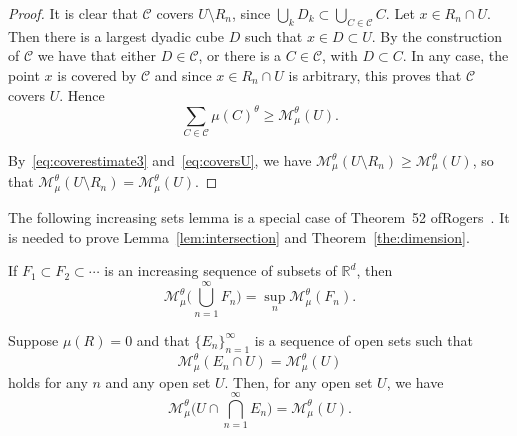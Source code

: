 \documentclass[AHL,Unicode,longabstracts]{cedram}
\begin{document}
\begin{proof}
It is clear that $\mathscr{C}$ covers $U \setminus R_n$, since $\bigcup_k D_k \subset \bigcup_{C \in \mathscr{C}} C$. Let $x \in R_n
\cap U$. Then there is a largest dyadic cube $D$ such that $x \in D
\subset U$. By the construction of $\mathscr{C}$ we have that either $D \in \mathscr{C}$, or there is a $C \in \mathscr{C}$, with $D
\subset C$. In any case, the point $x$ is covered by $\mathscr{C}$ and since $x \in R_n \cap U$ is arbitrary, this proves that $\mathscr{C}$ covers $U$. Hence
\begin{equation}\label{eq:coversU}
\sum_{C \in \mathscr{C}} \mu (C)^\theta \geq \mathscr{M}_\mu^\theta (U).
\end{equation}

By~\eqref{eq:coverestimate3} and~\eqref{eq:coversU}, we have $\mathscr{M}_\mu^\theta (U \setminus R_n) \geq
\mathscr{M}_\mu^\theta (U)$, so that $\mathscr{M}_\mu^\theta (U
\setminus R_n) = \mathscr{M}_\mu^\theta (U)$.
\end{proof}

The following increasing sets lemma is a special case of Theorem~52 of\linebreak Rogers~\cite{rogers}. It is needed to prove Lemma~\ref{lem:intersection} and Theorem~\ref{the:dimension}.

\begin{lemm}\label{lem:increasingsets}
If $F_1 \subset F_2 \subset \cdots$ is an increasing sequence of\/ subsets of\/ $\mathbb{R}^d$, then
\[
\mathscr{M}_\mu^\theta \biggl(\bigcup_{n=1}^\infty F_n \biggr) =
\sup_n \mathscr{M}_\mu^\theta (F_n).
\]
\end{lemm}

\begin{lemm}\label{lem:intersection}
Suppose $\mu (R) = 0$ and that $\{E_n\}_{n=1}^\infty$ is a sequence of open sets such that
\begin{equation}\label{eq:intersectionlemma}
\mathscr{M}_\mu^\theta (E_n \cap U) =
\mathscr{M}_\mu^\theta (U)
\end{equation}
holds for any $n$ and any open set $U$. Then, for any open set $U$, we have
\[
\mathscr{M}_\mu^\theta \biggl(U \cap \bigcap_{n=1}^\infty E_n
\biggr) = \mathscr{M}_\mu^\theta (U).
\]
\end{lemm}
\end{document}
